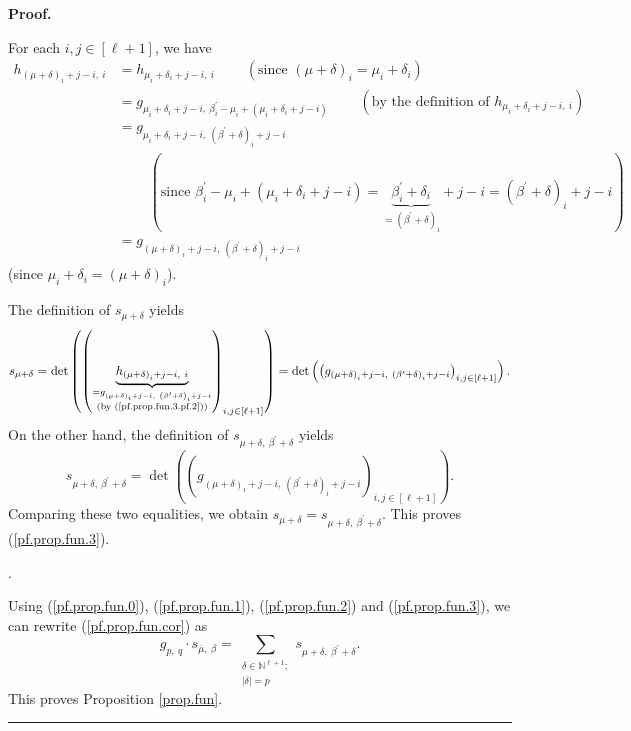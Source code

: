 \documentclass
[numbers=enddot,12pt,final,onecolumn,notitlepage,english]{scrartcl}%
\theoremstyle{definition}
\newenvironment{proof}[1][Proof]{\noindent\textbf{#1.} }{\ \rule{0.5em}{0.5em}}
\let\sumnonlimits\sum
\renewcommand{\sum}{\sumnonlimits\limits}
\newenvironment{verlong}{}{}
\begin{document}
\begin{verlong}
\begin{proof}
{For each $i,j\in\left[  \ell+1\right]  $, we have%
\begin{align}
h_{\left(  \mu+\delta\right)  _{i}+j-i,\ i}  &  =h_{\mu_{i}+\delta
_{i}+j-i,\ i}\ \ \ \ \ \ \ \ \ \ \left(  \text{since }\left(  \mu
+\delta\right)  _{i}=\mu_{i}+\delta_{i}\right) \nonumber\\
&  =g_{\mu_{i}+\delta_{i}+j-i,\ \beta_{i}^{\prime}-\mu_{i}+\left(  \mu
_{i}+\delta_{i}+j-i\right)  }\ \ \ \ \ \ \ \ \ \ \left(  \text{by the
definition of }h_{\mu_{i}+\delta_{i}+j-i,\ i}\right) \nonumber\\
&  =g_{\mu_{i}+\delta_{i}+j-i,\ \left(  \beta^{\prime}+\delta\right)
_{i}+j-i}\nonumber\\
&  \ \ \ \ \ \ \ \ \ \ \left(  \text{since }\beta_{i}^{\prime}-\mu_{i}+\left(
\mu_{i}+\delta_{i}+j-i\right)  =\underbrace{\beta_{i}^{\prime}+\delta_{i}%
}_{=\left(  \beta^{\prime}+\delta\right)  _{i}}+j-i=\left(  \beta^{\prime
}+\delta\right)  _{i}+j-i\right) \nonumber\\
&  =g_{\left(  \mu+\delta\right)  _{i}+j-i,\ \left(  \beta^{\prime}%
+\delta\right)  _{i}+j-i} \label{pf.prop.fun.3.pf.2}%
\end{align}
(since $\mu_{i}+\delta_{i}=\left(  \mu+\delta\right)  _{i}$).
\par
The definition of $s_{\mu+\delta}$ yields%
\[
s_{\mu+\delta}=\det\left(  \left(  \underbrace{h_{\left(  \mu+\delta\right)
_{i}+j-i,\ i}}_{\substack{=g_{\left(  \mu+\delta\right)  _{i}+j-i,\ \left(
\beta^{\prime}+\delta\right)  _{i}+j-i}\\\text{(by (\ref{pf.prop.fun.3.pf.2}%
))}}}\right)  _{i,j\in\left[  \ell+1\right]  }\right)  =\det\left(  \left(
g_{\left(  \mu+\delta\right)  _{i}+j-i,\ \left(  \beta^{\prime}+\delta\right)
_{i}+j-i}\right)  _{i,j\in\left[  \ell+1\right]  }\right)  .
\]
On the other hand, the definition of $s_{\mu+\delta,\ \beta^{\prime}+\delta}$
yields%
\[
s_{\mu+\delta,\ \beta^{\prime}+\delta}=\det\left(  \left(  g_{\left(
\mu+\delta\right)  _{i}+j-i,\ \left(  \beta^{\prime}+\delta\right)  _{i}%
+j-i}\right)  _{i,j\in\left[  \ell+1\right]  }\right)  .
\]
Comparing these two equalities, we obtain $s_{\mu+\delta}=s_{\mu
+\delta,\ \beta^{\prime}+\delta}$. This proves (\ref{pf.prop.fun.3}).}.

Using (\ref{pf.prop.fun.0}), (\ref{pf.prop.fun.1}), (\ref{pf.prop.fun.2}) and
(\ref{pf.prop.fun.3}), we can rewrite (\ref{pf.prop.fun.cor}) as%
\[
g_{p,\ q}\cdot s_{\overline{\mu},\ \beta}=\sum_{\substack{\delta\in
\mathbb{N}^{\ell+1};\\\left\vert \delta\right\vert =p}}s_{\mu+\delta
,\ \beta^{\prime}+\delta}.
\]
This proves Proposition \ref{prop.fun}.
\end{proof}
\end{verlong}
\end{document}
